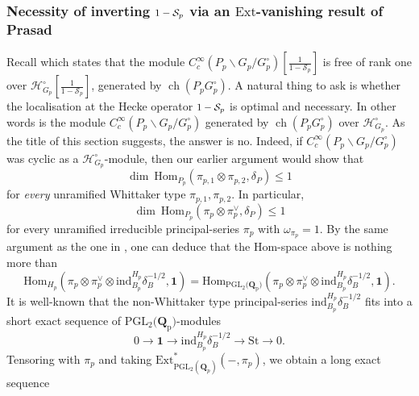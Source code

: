 \documentclass{amsart}%
\theoremstyle{plain}
\newcommand\scalemath[2]{\scalebox{#1}{\mbox{\ensuremath{\displaystyle #2}}}}
\theoremstyle{plain}
\theoremstyle{remark}
\DeclareMathOperator{\ch}{ch}
\begin{document}
\subsubsection{Necessity of inverting $\scalemath{0.9}{1-\mathcal{S}_p}$ via an $\mathrm{Ext}$-vanishing result of Prasad}\label{sec Ext vanishing} Recall  which states that the module $C_c^\infty(P_p\backslash G_p/G_p^\circ)[\frac{1}{1-\mathcal{S}_p}]$ is free of rank one over $\mathcal{H}_{G_p}^\circ[\frac{1}{1-\mathcal{S}_p}]$, generated by $\ch(P_pG_p^\circ)$. A natural thing to ask is whether the localisation at the Hecke operator $\scalemath{0.9}{1-\mathcal{S}_p}$ is optimal and necessary. In other words is the module $C_c^\infty(P_p\backslash G_p/G_p^\circ)$ generated by $\ch(P_pG_p^\circ)$ over $\mathcal{H}_{G_p}^\circ$. As the title of this section suggests, the answer is no. Indeed, if $C_c^\infty(P_p\backslash G_p/G_p^\circ)$ was cyclic as a $\mathcal{H}_{G_p}^\circ$-module, then our earlier argument would show that 
$$\dim\ \mathrm{Hom}_{P_p}(\pi_{p,1}\otimes \pi_{p,2},\delta_P)\leq 1$$
for \textit{every} unramified Whittaker type $\pi_{p,1},
\pi_{p,2}$. In particular,
$$\dim\ \mathrm{Hom}_{P_p}(\pi_p\otimes \pi_p^\vee,\delta_P)\leq 1$$
for every unramified irreducible principal-series $\pi_p$ with $\omega_{\pi_p}=1$. By the same argument as the one in , one can deduce that the Hom-space above is nothing more than
        $$\mathrm{Hom}_{H_p}\left(\pi_p\otimes \pi_p^\vee\otimes\mathrm{ind}_{B_p}^{H_p}\delta_B^{-1/2},\mathbf{1}\right)= \mathrm{Hom}_{\mathrm{PGL_2(\mathbf{Q}_p})}\left(\pi_p\otimes \pi_p^\vee\otimes\mathrm{ind}_{B_p}^{H_p}\delta_B^{-1/2},\mathbf{1}\right).$$
        It is well-known that the non-Whittaker type principal-series $\mathrm{ind}_{B_p}^{H_p}\delta_B^{-1/2}$ fits into a short exact sequence of $\mathrm{PGL_2(\mathbf{Q}_p})$-modules 
        $$0\longrightarrow \mathbf{1}\longrightarrow \mathrm{ind}_{B_p}^{H_p}\delta_B^{-1/2}\longrightarrow\mathrm{St}\longrightarrow 0.$$
        Tensoring with $\pi_p$ and taking $\mathrm{Ext}_{\mathrm{PGL}_2(\mathbf{Q}_p)}^{*}\left(-,\pi_p\right)$, we obtain a long exact sequence
        
\end{document}
